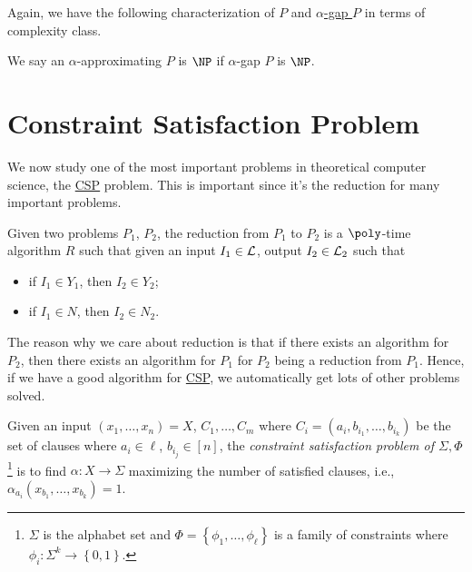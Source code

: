 Again, we have the following characterization of \(P\) and \hyperref[def:gap-P]{\(\alpha \)-gap \(P\)} in terms of complexity class.

\begin{definition}
	We say an \(\alpha \)-approximating \(P\) is \(\NP\) if \(\alpha \)-gap \(P\) is \(\NP\).
\end{definition}

\section{Constraint Satisfaction Problem}
We now study one of the most important problems in theoretical computer science, the \hyperref[prb:CSP]{CSP} problem. This is important since it's the reduction for many important problems.

\begin{prev}[Reduction]
	Given two problems \(P_1\), \(P_2\), the reduction from \(P_1\) to \(P_2\) is a \(\poly\)-time algorithm \(R\) such that given an input \(I_1\in \mathcal{\MakeUppercase{l}} \), output \(I_2\in \mathcal{\MakeUppercase{l}} _2\) such that
	\begin{itemize}
		\item if \(I_1\in Y_1\), then \(I_2\in Y_2\);
		\item if \(I_1\in N\), then \(I_2\in N_2\).
	\end{itemize}
\end{prev}

The reason why we care about reduction is that if there exists an algorithm for \(P_2\), then there exists an algorithm for \(P_1\) for \(P_2\) being a reduction from \(P_1\). Hence, if we have a good algorithm for \hyperref[prb:CSP]{CSP}, we automatically get lots of other problems solved.

\begin{problem}[CSP]\label{prb:CSP}
Given an input \((x_1, \ldots , x_n) = X\), \(C_1, \ldots  , C_m\) where \(C_i = (a_i, b_{i_1}, \ldots , b_{i_k})\) be the set of clauses where \(a_i\in {\ell }\), \(b_{i_j}\in [n]\), the \emph{constraint satisfaction problem of \(\Sigma, \Phi \)}\footnote{\(\Sigma \) is the alphabet set and \(\Phi = \left\{ \phi _1, \ldots , \phi _{\ell }  \right\} \) is a family of constraints where \(\phi _i \colon \Sigma ^k \to \left\{ 0, 1 \right\} \).} is to find \(\alpha \colon X\to \Sigma \) maximizing the number of satisfied clauses, i.e., \(\alpha _{a_i}(x_{b_1},\ldots , x_{b_k} )=1\).
\end{problem}


